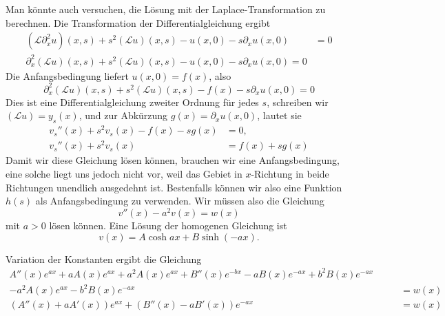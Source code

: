 \begin{loesung}
Man könnte auch versuchen, die Lösung mit der Laplace-Transformation
zu berechnen. Die Transformation der Differentialgleichung ergibt
\begin{align*}
(\mathscr{L}\partial_x^2u)(x,s)
+
s^2(\mathscr{L}u)(x, s)-u(x,0)-s\partial_xu(x,0)
&=0\\
\partial_x^2(\mathscr{L}u)(x,s)+s^2(\mathscr{L}u)(x, s)-u(x,0)-s\partial_xu(x,0)=0
\end{align*}
Die Anfangsbedingung liefert $u(x,0)=f(x)$, also
\[
\partial_x^2(\mathscr{L}u)(x,s)+s^2(\mathscr{L}u)(x, s)-f(x)-s\partial_xu(x,0)=0
\]
Dies ist eine Differentialgleichung zweiter Ordnung für jedes $s$, schreiben
wir $(\mathscr{L}u)=y_s(x)$, und zur Abkürzung $g(x)=\partial_xu(x,0)$,
lautet sie
\begin{align*}
v_s''(x)+s^2v_s(x)-f(x)-sg(x)&=0,\\
v_s''(x)+s^2v_s(x)&=f(x)+sg(x)
\end{align*}
Damit wir diese Gleichung lösen können, brauchen wir eine
Anfangsbedingung, eine solche liegt uns jedoch nicht vor, weil
das Gebiet in $x$-Richtung in beide Richtungen unendlich ausgedehnt
ist.
Bestenfalls können wir also eine Funktion $h(s)$ als Anfangsbedingung
zu verwenden. Wir müssen also die Gleichung
\[
v''(x)-a^2v(x)=w(x)
\]
mit $a>0$
lösen können. Eine Lösung der homogenen Gleichung ist
\[
v(x)=A\cosh ax+B\sinh(-ax).
\]

Variation der Konstanten ergibt die Gleichung
\begin{align*}
A''(x)e^{ax}+aA(x)e^{ax}+a^2A(x)e^{ax}
+
B''(x)e^{-bx}-aB(x)e^{-ax}+b^2B(x)e^{-ax}
\qquad
&
\\
-a^2A(x)e^{ax}-b^2B(x)e^{-ax}
&=
w(x)
\\
(A''(x)+aA'(x))e^{ax}
+
(B''(x)-aB'(x))e^{-ax}
&=
w(x)
\end{align*}
\end{loesung}
